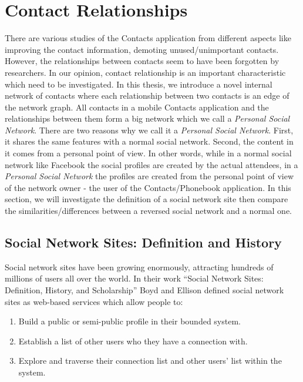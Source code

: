 \section{Contact Relationships}\label{contactrelationships}
There are various studies of the Contacts application from different aspects like improving the contact information, demoting unused/unimportant contacts. However, the relationships between contacts seem to have been forgotten by researchers. In our opinion, contact relationship is an important characteristic which need to be investigated. In this thesis, we introduce a novel internal network of contacts where each relationship between two contacts is an edge of the network graph. All contacts in a mobile Contacts application and the relationships between them form a big network which we call a \textit{Personal Social Network}. There are two reasons why we call it a \textit{Personal Social Network}. First, it shares the same features with a normal social network. Second, the content in it comes from a personal point of view. In other words, while in a normal social network like Facebook the social profiles are created by the actual attendees, in a \textit{Personal Social Network} the profiles are created from the personal point of view of the network owner - the user of the Contacts/Phonebook application. In this section, we will investigate the definition of a social network site then compare the similarities/differences between a reversed social network and a normal one.

\subsection{Social Network Sites: Definition and History}
Social network sites have been growing enormously, attracting hundreds of millions of users all over the world. In their work ``Social Network Sites: Definition, History, and Scholarship'' \cite{boyd2010social} Boyd and Ellison defined social network sites as web-based services which allow people to:

\begin{enumerate}
  \item Build a public or semi-public profile in their bounded system.
  \item Establish a list of other users who they have a connection with.
  \item Explore and traverse their connection list and other users' list within the system.
\end{enumerate}

